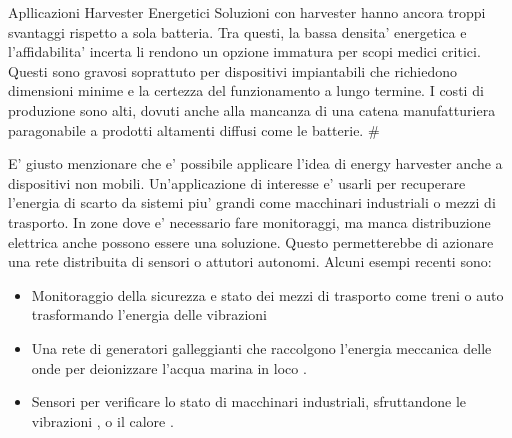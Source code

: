 \begin{multicols}{2}
\begin{section}{Apllicazioni Harvester Energetici}
    Soluzioni con harvester hanno ancora troppi svantaggi rispetto a sola batteria. Tra questi, la bassa densita' energetica e l'affidabilita' incerta li rendono un opzione immatura per scopi medici critici. Questi sono gravosi soprattuto per dispositivi impiantabili che richiedono dimensioni minime e la certezza del funzionamento a lungo termine. I costi di produzione sono alti, dovuti anche alla mancanza di una catena manufatturiera paragonabile a prodotti altamenti diffusi come le batterie. \#

    E' giusto menzionare che e' possibile applicare l'idea di energy harvester anche a dispositivi non mobili. Un'applicazione di interesse e' usarli per recuperare l'energia di scarto da sistemi piu' grandi come macchinari industriali o mezzi di trasporto. In zone dove e' necessario fare monitoraggi, ma manca distribuzione elettrica anche possono essere una soluzione. Questo permetterebbe di azionare una rete distribuita di sensori o attutori autonomi. Alcuni esempi recenti sono: \begin{itemize}
        \item Monitoraggio della sicurezza e stato dei mezzi di trasporto come treni o auto trasformando l'energia delle vibrazioni \cite{liSmartRailwayTransportation, liuCompactHybridizedTriboelectricelectromagnetic2024}
        \item Una rete di generatori galleggianti che raccolgono l'energia meccanica delle onde per deionizzare l'acqua marina in loco \cite{renWavepoweredCapacitiveDeionization2024}. 
        \item Sensori per verificare lo stato di macchinari industriali, sfruttandone le vibrazioni \cite{alvarezruedaVibrationEnergyHarvesting2024, gaoHybridGeneratorEfficient2024}, o il calore \cite{deoliveiraDevelopmentHybridEnergy2024}.
    \end{itemize}
    
\end{section}



\end{multicols}